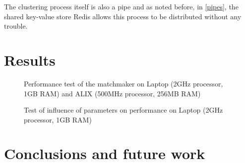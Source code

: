 \documentclass[9pt, twocolumn]{phdsymp} %
\begin{document}
The clustering process itself is also a pipe and as noted before, in \autoref{pipes}, the shared key-value store Redis allows this process to be distributed without any trouble.

\section{Results}

\begin{figure}[htpb!]
\centering
\caption{Performance test of the matchmaker on Laptop (2GHz processor, 1GB RAM) and ALIX (500MHz processor, 256MB RAM)}
\label{fig:testperformance}
\end{figure}


\begin{figure}[htpb!]
\centering
\caption{Test of influence of parameters on performance on Laptop (2GHz processor, 1GB RAM)}
\label{fig:testparameters}
\end{figure}



\section{Conclusions and future work}



\end{document}
